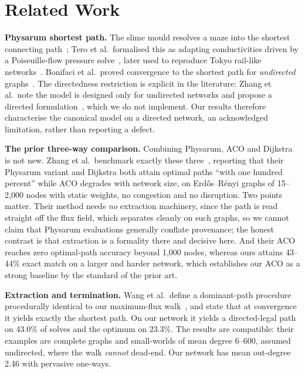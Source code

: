 \section{Related Work}

\textbf{Physarum shortest path.} The slime mould resolves a maze into the
shortest connecting path~\cite{nakagaki2000maze}; Tero et al.\ formalised
this as adapting conductivities driven by a Poiseuille-flow pressure
solve~\cite{tero2007mathematical}, later used to reproduce Tokyo rail-like
networks~\cite{tero2010rules}. Bonifaci et al.\ proved convergence to the
shortest path for \emph{undirected} graphs~\cite{bonifaci2012physarum}. The
directedness restriction is explicit in the literature: Zhang et al.\ note
the model is designed only for undirected networks and propose a directed
formulation~\cite{zhang2014directed}, which we do not implement. Our results
therefore characterise the canonical model on a directed network, an acknowledged
limitation, rather than reporting a defect.

\textbf{The prior three-way comparison.} Combining Physarum, ACO and
Dijkstra is not new. Zhang et al.\ benchmark exactly these
three~\cite{zhang2014improved}, reporting that their Physarum variant and
Dijkstra both attain optimal paths ``with one hundred percent'' while ACO
degrades with network size, on Erd\H{o}s--R\'enyi graphs of 15--2{,}000
nodes with static weights, no congestion and no disruption. Two points
matter. Their method needs \emph{no} extraction machinery, since the path is read
straight off the flux field, which separates cleanly on such graphs, so we
cannot claim that Physarum evaluations generally conflate provenance;
the honest contrast is that extraction is a formality there and decisive
here. And their ACO reaches zero optimal-path accuracy beyond 1{,}000 nodes,
whereas ours attains 43--44\% exact match on a larger and harder network,
which establishes our ACO as a strong baseline by the standard of the prior
art.

\textbf{Extraction and termination.} Wang et al.\ define a dominant-path
procedure procedurally identical to our maximum-flux
walk~\cite{wang2021transition}, and state that at convergence it yields
exactly the shortest path. On our network it yields a directed-legal path on
43.0\% of solves and the optimum on 23.3\%. The results are compatible: their
examples are complete graphs and small-worlds of mean degree 6--600, assumed
undirected, where the walk \emph{cannot} dead-end. Our network has mean
out-degree 2.46 with pervasive one-ways.

